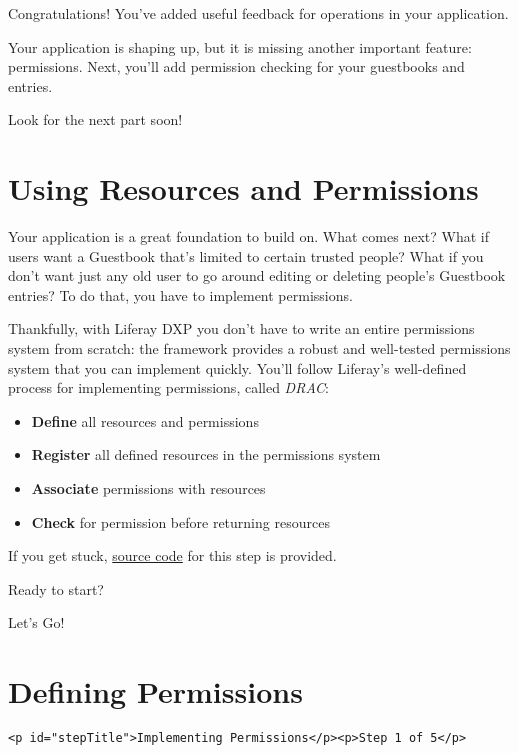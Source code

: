 Congratulations! You've added useful feedback for operations in your
application.

Your application is shaping up, but it is missing another important
feature: permissions. Next, you'll add permission checking for your
guestbooks and entries.

Look for the next part soon!

\chapter{Using Resources and
Permissions}\label{using-resources-and-permissions}

Your application is a great foundation to build on. What comes next?
What if users want a Guestbook that's limited to certain trusted people?
What if you don't want just any old user to go around editing or
deleting people's Guestbook entries? To do that, you have to implement
permissions.

Thankfully, with Liferay DXP you don't have to write an entire
permissions system from scratch: the framework provides a robust and
well-tested permissions system that you can implement quickly. You'll
follow Liferay's well-defined process for implementing permissions,
called \emph{DRAC}:

\begin{itemize}
\tightlist
\item
  \textbf{Define} all resources and permissions
\item
  \textbf{Register} all defined resources in the permissions system
\item
  \textbf{Associate} permissions with resources
\item
  \textbf{Check} for permission before returning resources
\end{itemize}

If you get stuck,
\href{https://github.com/liferay/liferay-docs/tree/master/en/developer/tutorials/code/guestbook/07-permissions/com-liferay-docs-guestbook}{source
code} for this step is provided.

Ready to start?

Let's Go!{}

\chapter{Defining Permissions}\label{defining-permissions}

\begin{verbatim}
<p id="stepTitle">Implementing Permissions</p><p>Step 1 of 5</p>
\end{verbatim}

